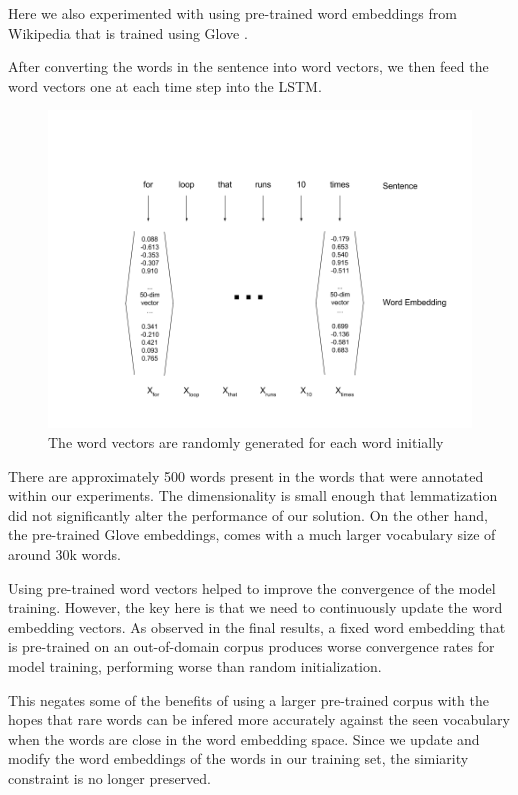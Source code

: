 \documentclass[fyp]{socreport}
\begin{document}
Here we also experimented with using pre-trained word embeddings from Wikipedia
that is trained using Glove \cite{pennington2014glove}.

After converting the words in the sentence into word vectors, we then feed the
word vectors one at each time step into the LSTM.

\begin{figure}[h]
\includegraphics[width=\textwidth]{embedding.png}
\caption{The word vectors are randomly generated for each word initially}
\centering
\end{figure}

There are approximately 500 words present in the words that were annotated within
our experiments. The dimensionality is small enough that lemmatization did
not significantly alter the performance of our solution. On the other hand, the
pre-trained Glove embeddings, comes with a much larger vocabulary size of
around 30k words.

Using pre-trained word vectors helped to improve the convergence of the model
training. However, the key here is that we need to continuously update the
word embedding vectors. As observed in the final results, a fixed word embedding
that is pre-trained on an out-of-domain corpus produces worse convergence rates
for model training, performing worse than random initialization.

This negates some of the benefits of using a larger pre-trained corpus with the
hopes that rare words can be infered more accurately against the seen vocabulary
when the words are close in the word embedding space. Since we update and
modify the word embeddings of the words in our training set, the simiarity
constraint is no longer preserved.
\end{document}
